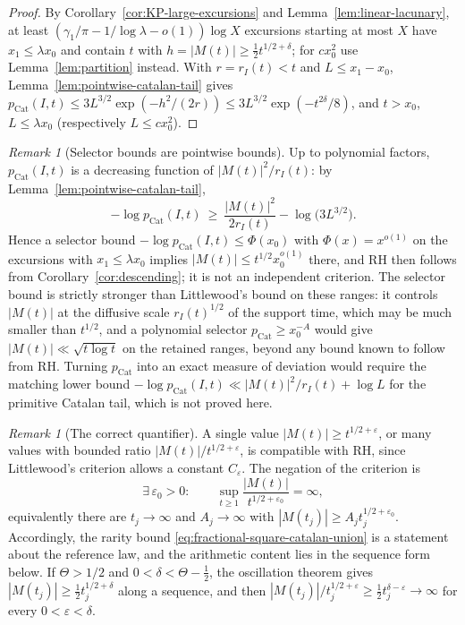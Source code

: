 \documentclass[11pt]{amsart}
\numberwithin{equation}{section}
\theoremstyle{plain}
\theoremstyle{definition}
\theoremstyle{remark}
\newtheorem{remark}[theorem]{Remark}
\newcommand{\eps}{\varepsilon}
\begin{document}
\begin{proof}
By Corollary~\ref{cor:KP-large-excursions} and Lemma~\ref{lem:linear-lacunary},
at least $(\gamma_1/\pi-1/\log\lambda-o(1))\log X$ excursions starting at
most $X$ have $x_1\le\lambda x_0$ and contain $t$ with
$h=|M(t)|\ge\frac12t^{1/2+\delta}$; for $cx_0^2$ use
Lemma~\ref{lem:partition} instead. With $r=r_I(t)<t$ and $L\le x_1-x_0$,
Lemma~\ref{lem:pointwise-catalan-tail} gives
$p_{\mathrm{Cat}}(I,t)\le3L^{3/2}\exp(-h^2/(2r))\le3L^{3/2}\exp(-t^{2\delta}/8)$,
and $t>x_0$, $L\le\lambda x_0$ (respectively $L\le cx_0^2$).
\end{proof}

\begin{remark}[Selector bounds are pointwise bounds]
\label{rem:catalan-selector-gap}
Up to polynomial factors, $p_{\mathrm{Cat}}(I,t)$ is a decreasing function of
$|M(t)|^2/r_I(t)$: by Lemma~\ref{lem:pointwise-catalan-tail},
\[
-\log p_{\mathrm{Cat}}(I,t)\ \ge\ \frac{|M(t)|^2}{2r_I(t)}-\log\bigl(3L^{3/2}\bigr).
\]
Hence a selector bound $-\log p_{\mathrm{Cat}}(I,t)\le\Phi(x_0)$ with
$\Phi(x)=x^{o(1)}$ on the excursions with $x_1\le\lambda x_0$ implies
$|M(t)|\le t^{1/2}x_0^{o(1)}$ there, and RH then follows from
Corollary~\ref{cor:descending}; it is not an independent criterion. The
selector bound is strictly stronger than Littlewood's bound on these
ranges: it controls $|M(t)|$ at the diffusive scale $r_I(t)^{1/2}$ of the
support time, which may be much smaller than $t^{1/2}$, and a polynomial
selector $p_{\mathrm{Cat}}\ge x_0^{-A}$ would give $|M(t)|\ll\sqrt{t\log t}$
on the retained ranges, beyond any bound known to follow from RH. Turning
$p_{\mathrm{Cat}}$ into an exact measure of deviation would require the
matching lower bound $-\log p_{\mathrm{Cat}}(I,t)\ll|M(t)|^2/r_I(t)+\log L$
for the primitive Catalan tail, which is not proved here.
\end{remark}

\begin{remark}[The correct quantifier]
\label{rem:quantifier}
A single value $|M(t)|\ge t^{1/2+\eps}$, or many values with bounded ratio
$|M(t)|/t^{1/2+\eps}$, is compatible with RH, since Littlewood's criterion
allows a constant $C_\eps$. The negation of the criterion is
\[
\exists\,\eps_0>0:\qquad
\sup_{t\ge1}\frac{|M(t)|}{t^{1/2+\eps_0}}=\infty,
\]
equivalently there are $t_j\to\infty$ and $A_j\to\infty$ with
$|M(t_j)|\ge A_jt_j^{1/2+\eps_0}$. Accordingly, the rarity bound
\eqref{eq:fractional-square-catalan-union} is a statement about the
reference law, and the arithmetic content lies in the sequence form
below. If $\Theta>1/2$ and $0<\delta<\Theta-\frac12$, the oscillation
theorem gives $|M(t_j)|\ge\frac12t_j^{1/2+\delta}$ along a sequence, and then
$|M(t_j)|/t_j^{1/2+\eps}\ge\frac12t_j^{\delta-\eps}\to\infty$ for every
$0<\eps<\delta$.
\end{remark}
\end{document}
